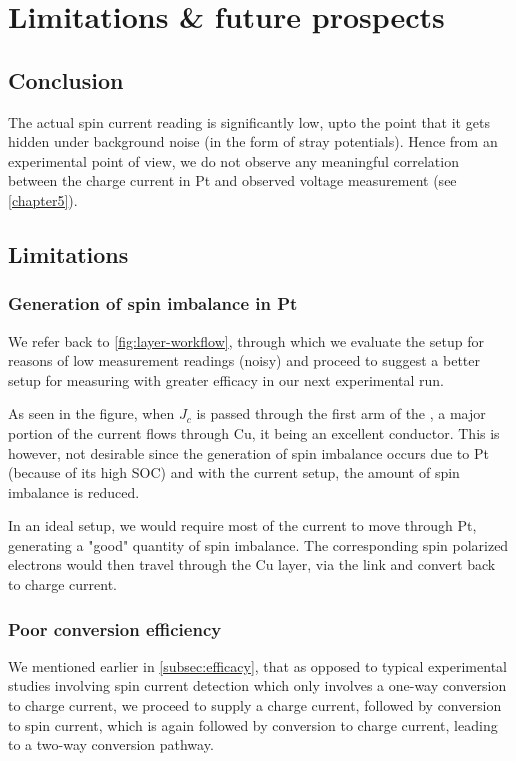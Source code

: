\chapter{Limitations \& future prospects}

\label{chapter6}

\section{Conclusion}

The actual spin current reading is significantly low, upto the point that it gets hidden under background noise (in the form of stray potentials).
Hence from an experimental point of view, we do not observe any meaningful correlation between the charge current in Pt and observed voltage measurement (see \cref{chapter5}).

\section{Limitations}

\subsection{Generation of spin imbalance in Pt}

We refer back to \cref{fig:layer-workflow}, through which we evaluate the setup for reasons of low measurement readings (noisy) and proceed to suggest a better setup for measuring with greater efficacy in our next experimental run.

As seen in the figure, when \( J_c \) is passed through the first arm of the \Hst, a major portion of the current flows through Cu, it being an excellent conductor.
This is however, not desirable since the generation of spin imbalance occurs due to Pt (because of its high SOC) and with the current setup, the amount of spin imbalance is reduced.

In an ideal setup, we would require most of the current to move through Pt, generating a "good" quantity of spin imbalance.
The corresponding spin polarized electrons would then travel through the Cu layer, via the link and convert back to charge current.


\subsection{Poor conversion efficiency}

We mentioned earlier in \cref{subsec:efficacy}, that as opposed to typical experimental studies involving spin current detection which only involves a one-way conversion to charge current, we proceed to supply a charge current, followed by conversion to spin current, which is again followed by conversion to charge current, leading to a two-way conversion pathway.

